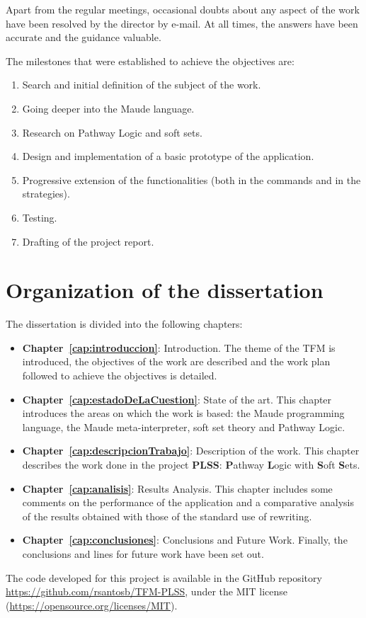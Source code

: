 Apart from the regular meetings, occasional doubts about any aspect of the work have been resolved by the director by e-mail.
At all times, the answers have been accurate and the guidance valuable.
\smallskip

The milestones that were established to achieve the objectives are:
\begin{enumerate}
\item Search and initial definition of the subject of the work.
\item Going deeper into the Maude language.
\item Research on Pathway Logic and soft sets.
\item Design and implementation of a basic prototype of the application.
\item Progressive extension of the functionalities (both in the commands and in the strategies).
\item Testing. 
\item Drafting of the project report.
\end{enumerate}


\section{Organization of the dissertation}

The dissertation is divided into the following chapters:

\begin{itemize}
\item \textbf{Chapter~\ref{cap:introduccion}}: Introduction. 
The theme of the TFM is introduced, the objectives of the work are described and the work plan followed to achieve the objectives is detailed. 

\item \textbf{Chapter~\ref{cap:estadoDeLaCuestion}}: State of the art. 
This chapter introduces the areas on which the work is based: the Maude programming language, the Maude meta-interpreter, soft set theory and Pathway Logic.

\item \textbf{Chapter~\ref{cap:descripcionTrabajo}}: Description of the work.
This chapter describes the work done in the project \textbf{PLSS}: \textbf{P}athway \textbf{L}ogic with \textbf{S}oft \textbf{S}ets.

\item \textbf{Chapter~\ref{cap:analisis}}: Results Analysis.
This chapter includes some comments on the performance of the application and a comparative analysis of the results obtained with those of the standard use of rewriting.

\item \textbf{Chapter~\ref{cap:conclusiones}}: Conclusions and Future Work.
Finally, the conclusions and lines for future work have been set out.
\end{itemize}
\medskip


The code developed for this project is available in the GitHub repository
\url{https://github.com/rsantosb/TFM-PLSS}, under the MIT license (\url{https://opensource.org/licenses/MIT}).



